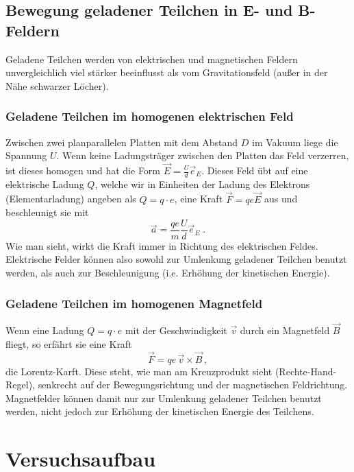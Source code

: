 \subsection{Bewegung geladener Teilchen in E- und B-Feldern}

Geladene Teilchen werden von elektrischen und magnetischen Feldern unvergleichlich viel stärker beeinflusst als vom Gravitationsfeld (außer in der Nähe schwarzer Löcher). 

\subsubsection*{Geladene Teilchen im homogenen elektrischen Feld}

Zwischen zwei planparallelen Platten mit dem Abstand $D$ im Vakuum liege die Spannung $U$. Wenn keine Ladungsträger zwischen den Platten das Feld verzerren, ist dieses homogen und hat die Form $\vec{E}=\frac{U}{d}\vec{e}_E$. Dieses Feld übt auf eine elektrische Ladung $Q$, welche wir in Einheiten der Ladung des Elektrons (Elementarladung) angeben als $Q = q\cdot e$, eine Kraft $\vec{F} = qe\vec{E}$ aus und beschleunigt sie mit
\begin{equation}
	\vec{a} = \frac{qe}{m}\frac{U}{d}\vec{e}_E\; .
\end{equation}
Wie man sieht, wirkt die Kraft immer in Richtung des elektrischen Feldes. Elektrische Felder können also sowohl zur Umlenkung geladener Teilchen benutzt werden, als auch zur Beschleunigung (i.e. Erhöhung der kinetischen Energie).

\subsubsection*{Geladene Teilchen im homogenen Magnetfeld}

Wenn eine Ladung $Q = q\cdot e$ mit der Geschwindigkeit $\vec{v}$ durch ein Magnetfeld $\vec{B}$ fliegt, so erfährt sie eine Kraft 
\begin{equation}
	\vec{F} = qe\, \vec{v}\times\vec{B}\, ,
\end{equation}
die Lorentz-Karft. Diese steht, wie man am Kreuzprodukt sieht (Rechte-Hand-Regel), senkrecht auf der Bewegungsrichtung und der magnetischen Feldrichtung. Magnetfelder können damit nur zur Umlenkung geladener Teilchen benutzt werden, nicht jedoch zur Erhöhung der kinetischen Energie des Teilchens.

\section{Versuchsaufbau}

